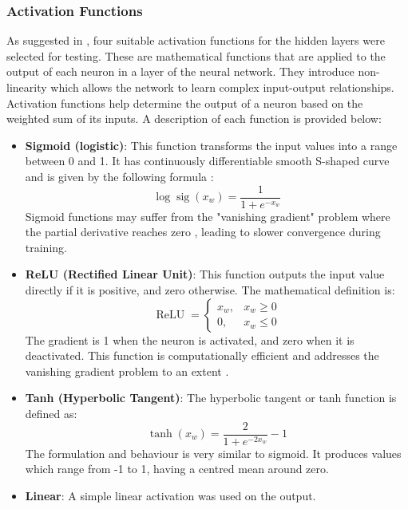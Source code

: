 \subsubsection{Activation Functions} \label{Activation functions}

As suggested in \cite{Marian2022}, four suitable activation functions for the hidden layers were selected for testing. These are mathematical functions that are applied to the output of each neuron in a layer of the neural network. They introduce non-linearity which allows the network to learn complex input-output relationships. Activation functions help determine the output of a neuron based on the weighted sum of its inputs. A description of each function is provided below:

\begin{itemize}
	\item \textbf{Sigmoid (logistic)}: This function transforms the input values into a range between 0 and 1. It has continuously differentiable smooth S-shaped curve and is given by the following formula \cite{Han1995}:
	\begin{equation}\label{Logistic sigmoid}
		\log \operatorname{sig}(x_w)=\frac{1}{1+e^{-x_w}}
	\end{equation} 
	Sigmoid functions may suffer from the "vanishing gradient" problem where the partial derivative reaches zero \cite{Sharma2020}, leading to slower convergence during training.
	
	\item \textbf{ReLU (Rectified Linear Unit)}: This function outputs the input value directly if it is positive, and zero otherwise. The mathematical definition is:
	\begin{equation}\label{ReLU}
		\operatorname{ReLU}= \begin{cases}x_w, & x_w \geq 0 \\ 0, & x_w \leq 0\end{cases}
	\end{equation}
	The gradient is 1 when the neuron is activated, and zero when it is deactivated. This function is computationally efficient and addresses the vanishing gradient problem to an extent \cite{Sharma2020}.
	
	\item \textbf{Tanh (Hyperbolic Tangent)}: The hyperbolic tangent or tanh function is defined as:
	\begin{equation}\label{Hyperbolic tangent}
		\tanh (x_w)=\frac{2}{1+e^{-2 x_w}}-1
	\end{equation}
	The formulation and behaviour is very similar to sigmoid. It produces values which range from -1 to 1, having a centred mean around zero.
	
	\item \textbf{Linear}: A simple linear activation was used on the output.
	
\end{itemize}

